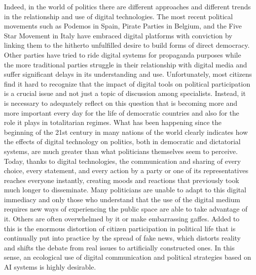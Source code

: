 Indeed, in the world of politics there are different approaches and different trends in the relationship and use of digital technologies. The most recent political movements such as Podemos in Spain, Pirate Parties in Belgium, and the Five Star Movement in Italy have embraced digital platforms with conviction by linking them to the hitherto unfulfilled desire to build forms of direct democracy. Other parties have tried to ride digital systems for propaganda purposes while the more traditional parties struggle in their relationship with digital media and suffer significant delays in its understanding and use. Unfortunately, most citizens find it hard to recognize that the impact of digital tools on political participation is a crucial issue and not just a topic of discussion among specialists. Instead, it is necessary to adequately reflect on this question that is becoming more and more important every day for the life of democratic countries and also for the role it plays in totalitarian regimes. What has been happening since the beginning of the 21st century in many nations of the world clearly indicates how the effects of digital technology on politics, both in democratic and dictatorial systems, are much greater than what politicians themselves seem to perceive. Today, thanks to digital technologies, the communication and sharing of every choice, every statement, and every action by a party or one of its representatives reaches everyone instantly, creating moods and reactions that previously took much longer to disseminate. Many politicians are unable to adapt to this digital immediacy and only those who understand that the use of the digital medium requires new ways of experiencing the public space are able to take advantage of it. Others are often overwhelmed by it or make embarrassing gaffes. Added to this is the enormous distortion of citizen participation in political life that is continually put into practice by the spread of fake news, which distorts reality and shifts the debate from real issues to artificially constructed ones. In this sense, an ecological use of digital communication and political strategies based on AI systems is highly desirable.

